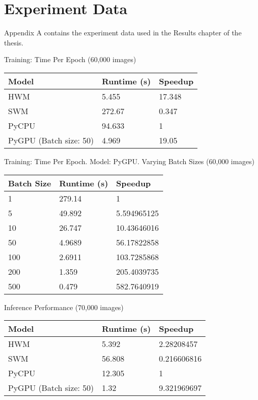 \chapter{Experiment Data}\label{app:exp}
Appendix A contains the experiment data used in the Results chapter of the thesis.
\begin{table}
	\centering 
	\large Training: Time Per Epoch (60,000 images)\\
	\normalsize
	\begin{tabular}{|l|l|l|}
		\hline
		\textbf{Model}	& \textbf{Runtime (s)} & \textbf{ Speedup }\\\hline 
		HWM 			& 5.455		& 17.348 \\\hline 
		SWM				& 272.67	& 0.347	\\\hline 
		PyCPU			& 94.633	& 1 \\\hline 
		PyGPU (Batch size: 50) & 4.969 & 19.05 \\\hline
	\end{tabular}
\end{table}

\begin{table}
	\centering 
	\large Training: Time Per Epoch. Model: PyGPU. Varying Batch Sizes (60,000 images)\\
	\normalsize
	\begin{tabular}{|l|l|l|}
		\hline
		\textbf{Batch Size} & \textbf{Runtime (s)} & \textbf{Speedup} \\\hline 
		1 		& 	279.14	& 1 \\\hline 
		5 		& 	49.892	& 5.594965125 \\\hline 
		10 		& 	26.747	& 10.43646016 \\\hline 
		50		& 	4.9689	& 56.17822858 \\\hline 
		100		& 	2.6911	& 103.7285868 \\\hline 
		200		& 	1.359	& 205.4039735 \\\hline 
		500		& 	0.479	& 582.7640919 \\\hline 
	\end{tabular}
\end{table}

\begin{table}
	\centering 
	\large Inference Performance (70,000 images)\\
	\normalsize
	\begin{tabular}{|l|l|l|}
		\hline
		\textbf{Model}	& \textbf{Runtime (s)} & \textbf{ Speedup }\\\hline 
		HWM 			        & 5.392		& 2.28208457 \\\hline 
		SWM				        & 56.808	& 0.216606816\\\hline 
		PyCPU			        & 12.305	& 1         \\\hline 
		PyGPU (Batch size: 50)  & 1.32	    & 9.321969697\\\hline
	\end{tabular}
\end{table}

